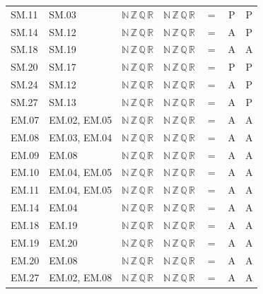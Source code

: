 {\begin{longtable}{l l l l c c c}
SM.11 & SM.03 & $\mathbb N\,\mathbb Z\,\mathbb Q\,\mathbb R$ & $\mathbb N\,\mathbb Z\,\mathbb Q\,\mathbb R$ & $=$ & P & P \\
SM.14 & SM.12 & $\mathbb N\,\mathbb Z\,\mathbb Q\,\mathbb R$ & $\mathbb N\,\mathbb Z\,\mathbb Q\,\mathbb R$ & $=$ & A & P \\
SM.18 & SM.19 & $\mathbb N\,\mathbb Z\,\mathbb Q\,\mathbb R$ & $\mathbb N\,\mathbb Z\,\mathbb Q\,\mathbb R$ & $=$ & A & A \\
SM.20 & SM.17 & $\mathbb N\,\mathbb Z\,\mathbb Q\,\mathbb R$ & $\mathbb N\,\mathbb Z\,\mathbb Q\,\mathbb R$ & $=$ & P & P \\
SM.24 & SM.12 & $\mathbb N\,\mathbb Z\,\mathbb Q\,\mathbb R$ & $\mathbb N\,\mathbb Z\,\mathbb Q\,\mathbb R$ & $=$ & A & P \\
SM.27 & SM.13 & $\mathbb N\,\mathbb Z\,\mathbb Q\,\mathbb R$ & $\mathbb N\,\mathbb Z\,\mathbb Q\,\mathbb R$ & $=$ & A & P \\
EM.07 & EM.02, EM.05 & $\mathbb N\,\mathbb Z\,\mathbb Q\,\mathbb R$ & $\mathbb N\,\mathbb Z\,\mathbb Q\,\mathbb R$ & $=$ & A & A \\
EM.08 & EM.03, EM.04 & $\mathbb N\,\mathbb Z\,\mathbb Q\,\mathbb R$ & $\mathbb N\,\mathbb Z\,\mathbb Q\,\mathbb R$ & $=$ & A & A \\
EM.09 & EM.08 & $\mathbb N\,\mathbb Z\,\mathbb Q\,\mathbb R$ & $\mathbb N\,\mathbb Z\,\mathbb Q\,\mathbb R$ & $=$ & A & A \\
EM.10 & EM.04, EM.05 & $\mathbb N\,\mathbb Z\,\mathbb Q\,\mathbb R$ & $\mathbb N\,\mathbb Z\,\mathbb Q\,\mathbb R$ & $=$ & A & A \\
EM.11 & EM.04, EM.05 & $\mathbb N\,\mathbb Z\,\mathbb Q\,\mathbb R$ & $\mathbb N\,\mathbb Z\,\mathbb Q\,\mathbb R$ & $=$ & A & A \\
EM.14 & EM.04 & $\mathbb N\,\mathbb Z\,\mathbb Q\,\mathbb R$ & $\mathbb N\,\mathbb Z\,\mathbb Q\,\mathbb R$ & $=$ & A & A \\
EM.18 & EM.19 & $\mathbb N\,\mathbb Z\,\mathbb Q\,\mathbb R$ & $\mathbb N\,\mathbb Z\,\mathbb Q\,\mathbb R$ & $=$ & A & A \\
EM.19 & EM.20 & $\mathbb N\,\mathbb Z\,\mathbb Q\,\mathbb R$ & $\mathbb N\,\mathbb Z\,\mathbb Q\,\mathbb R$ & $=$ & A & A \\
EM.20 & EM.08 & $\mathbb N\,\mathbb Z\,\mathbb Q\,\mathbb R$ & $\mathbb N\,\mathbb Z\,\mathbb Q\,\mathbb R$ & $=$ & A & A \\
EM.27 & EM.02, EM.08 & $\mathbb N\,\mathbb Z\,\mathbb Q\,\mathbb R$ & $\mathbb N\,\mathbb Z\,\mathbb Q\,\mathbb R$ & $=$ & A & A \\

\end{longtable}}
